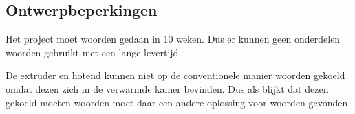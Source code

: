 \subsection{Ontwerpbeperkingen}

Het project moet woorden gedaan in 10 weken. Dus er kunnen geen onderdelen
woorden gebruikt met een lange levertijd.

De extruder en hotend kunnen niet op de conventionele manier woorden gekoeld
omdat dezen zich in de verwarmde kamer bevinden. Dus als blijkt dat dezen
gekoeld moeten woorden moet daar een andere oplossing voor woorden gevonden.